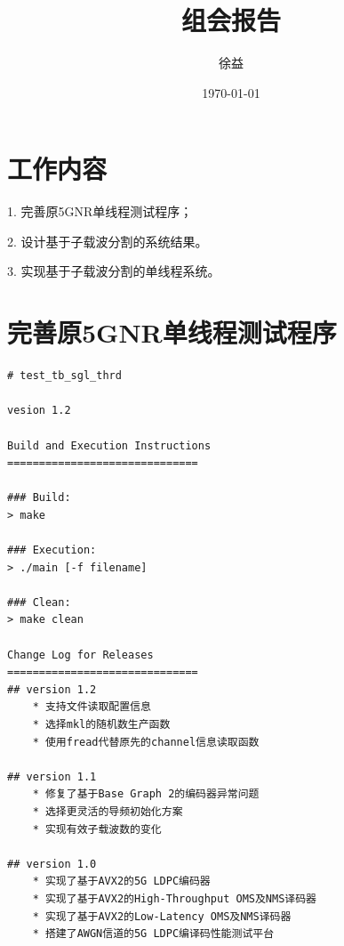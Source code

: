 \documentclass{article}
\title{组会报告}
\author{徐益}
\date{\today}
\begin{document}
\maketitle


\section{工作内容} 
1. 完善原5GNR单线程测试程序；

2. 设计基于子载波分割的系统结果。

3. 实现基于子载波分割的单线程系统。

\section{完善原5GNR单线程测试程序}
\begin{lstlisting}
# test_tb_sgl_thrd

vesion 1.2

Build and Execution Instructions
==============================

### Build:
> make

### Execution:
> ./main [-f filename]

### Clean:
> make clean

Change Log for Releases
==============================
## version 1.2
    * 支持文件读取配置信息
    * 选择mkl的随机数生产函数
    * 使用fread代替原先的channel信息读取函数

## version 1.1
    * 修复了基于Base Graph 2的编码器异常问题
    * 选择更灵活的导频初始化方案
    * 实现有效子载波数的变化    

## version 1.0
    * 实现了基于AVX2的5G LDPC编码器
    * 实现了基于AVX2的High-Throughput OMS及NMS译码器
    * 实现了基于AVX2的Low-Latency OMS及NMS译码器
    * 搭建了AWGN信道的5G LDPC编译码性能测试平台
\end{lstlisting}

\end{document}
